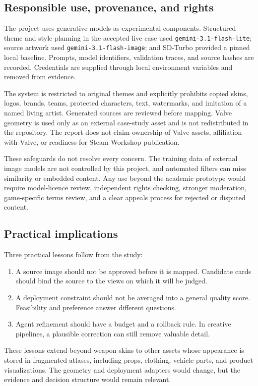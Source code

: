 \subsection{Responsible use, provenance, and rights}

The project uses generative models as experimental components. Structured theme
and style planning in the accepted live case used
\texttt{gemini-3.1-flash-lite}; source artwork used
\texttt{gemini-3.1-flash-image}; and SD-Turbo provided a pinned local baseline.
Prompts, model identifiers, validation traces, and source hashes are recorded.
Credentials are supplied through local environment variables and removed from
evidence.

The system is restricted to original themes and explicitly prohibits copied skins,
logos, brands, teams, protected characters, text, watermarks, and imitation of a
named living artist. Generated sources are reviewed before mapping. Valve geometry
is used only as an external case-study asset and is not redistributed in the
repository. The report does not claim ownership of Valve assets, affiliation with
Valve, or readiness for Steam Workshop publication.

These safeguards do not resolve every concern. The training data of external image
models are not controlled by this project, and automated filters can miss
similarity or embedded content. Any use beyond the academic prototype would
require model-licence review, independent rights checking, stronger moderation,
game-specific terms review, and a clear appeals process for rejected or disputed
content.

\subsection{Practical implications}

Three practical lessons follow from the study:

\begin{enumerate}
  \item A source image should not be approved before it is mapped. Candidate cards
  should bind the source to the views on which it will be judged.
  \item A deployment constraint should not be averaged into a general quality
  score. Feasibility and preference answer different questions.
  \item Agent refinement should have a budget and a rollback rule. In creative
  pipelines, a plausible correction can still remove valuable detail.
\end{enumerate}

These lessons extend beyond weapon skins to other assets whose appearance is
stored in fragmented atlases, including props, clothing, vehicle parts, and
product visualizations. The geometry and deployment adapters would change, but
the evidence and decision structure would remain relevant.
